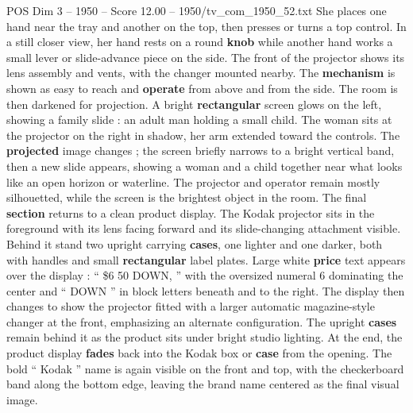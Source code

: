 \begin{textsample}{POS Dim 3 – 1950 – Score 12.00 – 1950/tv\_com\_1950\_52.txt}
She places one hand near the tray and another on the top, then presses or turns a top control.
In a still closer view, her hand rests on a round \textbf{knob} while another hand works a small lever or slide-advance piece on the side.
The front of the projector shows its lens assembly and vents, with the changer mounted nearby.
The \textbf{mechanism} is shown as easy to reach and \textbf{operate} from above and from the side.
The room is then darkened for projection.
A bright \textbf{rectangular} screen glows on the left, showing a family slide : an adult man holding a small child.
The woman sits at the projector on the right in shadow, her arm extended toward the controls.
The \textbf{projected} image changes ; the screen briefly narrows to a bright vertical band, then a new slide appears, showing a woman and a child together near what looks like an open horizon or waterline.
The projector and operator remain mostly silhouetted, while the screen is the brightest object in the room.
The final \textbf{section} returns to a clean product display.
The Kodak projector sits in the foreground with its lens facing forward and its slide-changing attachment visible.
Behind it stand two upright carrying \textbf{cases}, one lighter and one darker, both with handles and small \textbf{rectangular} label plates.
Large white \textbf{price} text appears over the display : “ \$6 50 DOWN, ” with the oversized numeral 6 dominating the center and “ DOWN ” in block letters beneath and to the right.
The display then changes to show the projector fitted with a larger automatic magazine-style changer at the front, emphasizing an alternate configuration.
The upright \textbf{cases} remain behind it as the product sits under bright studio lighting.
At the end, the product display \textbf{fades} back into the Kodak box or \textbf{case} from the opening.
The bold “ Kodak ” name is again visible on the front and top, with the checkerboard band along the bottom edge, leaving the brand name centered as the final visual image.

\end{textsample}

